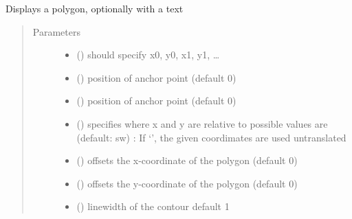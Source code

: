 \documentclass[letterpaper,10pt,english]{sphinxmanual}
\begin{document}
\begin{fulllineitems}
\label{\detokenize{Reference:salabim.AnimatePolygon}}
Displays a polygon, optionally with a text
\begin{quote}\begin{description}
\item[{Parameters}] \leavevmode\begin{itemize}
\item {} 
 () \textendash{} should specify x0, y0, x1, y1, …

\item {} 
 () \textendash{} position of anchor point (default 0)

\item {} 
 () \textendash{} position of anchor point (default 0)

\item {} 
 () \textendash{} specifies where x and y are relative to 
possible values are (default: sw) : 
If ‘’, the given coordimates are used untranslated

\item {} 
 () \textendash{} offsets the x-coordinate of the polygon (default 0)

\item {} 
 () \textendash{} offsets the y-coordinate of the polygon (default 0)

\item {} 
 () \textendash{} linewidth of the contour 
default 1


\end{itemize}
\end{description}
\end{quote}
\end{fulllineitems}
\end{document}
